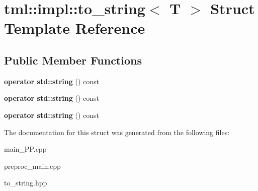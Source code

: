 \hypertarget{structtml_1_1impl_1_1to__string}{\section{tml\+:\+:impl\+:\+:to\+\_\+string$<$ T $>$ Struct Template Reference}
\label{structtml_1_1impl_1_1to__string}
}
\subsection*{Public Member Functions}
\begin{DoxyCompactItemize}
\item 
\hypertarget{structtml_1_1impl_1_1to__string_a760357ab5cc9db29bf44e7d20af100c9}{{\bfseries operator std\+::string} () const }\label{structtml_1_1impl_1_1to__string_a760357ab5cc9db29bf44e7d20af100c9}

\item 
\hypertarget{structtml_1_1impl_1_1to__string_a760357ab5cc9db29bf44e7d20af100c9}{{\bfseries operator std\+::string} () const }\label{structtml_1_1impl_1_1to__string_a760357ab5cc9db29bf44e7d20af100c9}

\item 
\hypertarget{structtml_1_1impl_1_1to__string_a760357ab5cc9db29bf44e7d20af100c9}{{\bfseries operator std\+::string} () const }\label{structtml_1_1impl_1_1to__string_a760357ab5cc9db29bf44e7d20af100c9}

\end{DoxyCompactItemize}


The documentation for this struct was generated from the following files\+:\begin{DoxyCompactItemize}
\item 
main\+\_\+\+P\+P.\+cpp\item 
preproc\+\_\+main.\+cpp\item 
to\+\_\+string.\+hpp\end{DoxyCompactItemize}

